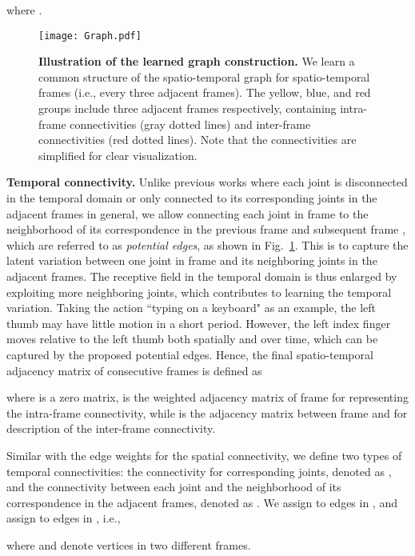 \documentclass[conference]{IEEEtran}
\begin{document}
where . 


\begin{figure}[t]
    \centering
    \texttt{[image: Graph.pdf]}
    \caption{\textbf{Illustration of the learned graph construction.} We learn a common structure of the spatio-temporal graph for  spatio-temporal frames (i.e., every three adjacent frames). The yellow, blue, and red groups include three adjacent frames respectively, containing intra-frame connectivities (gray dotted lines) and inter-frame connectivities (red dotted lines). Note that the connectivities are simplified for clear visualization.}
    \label{fig:graph}
\end{figure}

\textbf{Temporal connectivity.} Unlike previous works where each joint is disconnected in the temporal domain or only connected to its corresponding joints in the adjacent frames in general, we allow connecting each joint in frame  to the neighborhood of its correspondence in the previous frame  and subsequent frame , which are referred to as \textit{potential edges}, as shown in Fig.~\ref{fig:graph}. This is to capture the latent variation between one joint in frame  and its neighboring joints in the adjacent frames. The receptive field in the temporal domain is thus enlarged by exploiting more neighboring joints, which contributes to learning the temporal variation. Taking the action ``typing on a keyboard" as an example, the left thumb may have little motion in a short period. However, the left index finger moves relative to the left thumb both spatially and over time, which can be captured by the proposed potential edges. Hence, the final spatio-temporal adjacency matrix of consecutive frames  is defined as 

where  is a zero matrix,  is the weighted adjacency matrix of frame  for representing the intra-frame connectivity, while  is the adjacency matrix between frame  and  for description of the inter-frame connectivity. 

Similar with the edge weights for the spatial connectivity, we define two types of temporal connectivities: the connectivity for corresponding joints, denoted as , and the connectivity between each joint and the neighborhood of its correspondence in the adjacent frames, denoted as . We assign  to edges in , and assign  to edges in , i.e., 

where  and  denote vertices in two different frames.
\end{document}
